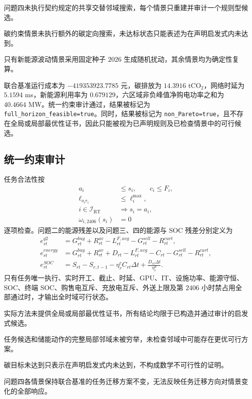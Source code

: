 \documentclass[withoutpreface,bwprint]{cumcmthesis}
\begin{document}
问题四未执行契约规定的共享交替邻域搜索，每个情景只重建并审计一个规则型候选。

碳约束情景未执行额外的碳定向搜索，未达标状态只能表述为在声明启发式内未达到。

只有新能源波动情景采用固定种子 $2026$ 生成随机扰动，其余情景均为确定性复算。

联合基准运行成本为 $-419353923.7785$ 元，碳排放为 $14.3916$ tCO$_2$，网络时延为 $5.1594$ ms，新能源利用率为 $0.679129$，六区域非负峰值净购电功率之和为 $40.4664$ MW。统一约束审计通过，结果被标记为 \texttt{full\_horizon\_feasible=true}。同时，结果被标记为 \texttt{non\_Pareto=true}，且不存在全局或局部最优性证书，因此只能被视为已声明规则及已检查情景中的可行候选。

\subsection{统一约束审计}

任务合法性按
\begin{align}
a_i&\le s_i,\qquad c_i\le F_i,\\
\ell_{o_ir_i}&\le\ell_i^{\max},\\
i\in\mathcal I_{\mathrm{RT}}&\Rightarrow s_i=a_i,\\
\omega_{i,2406}(s_i)&=0
\end{align}
逐项检查。问题二的能源残差以及问题三、四的能源与 SOC 残差分别定义为
\begin{align}
e_{rt}^{q2}
&=G_{rt}^{buy}+R_{rt}^{av}
-L_{rt}^{F,avg}-G_{rt}^{sell}-R_{rt}^{curt},\\
e_{rt}^{energy}
&=G_{rt}^{buy}+R_{rt}^{av}+D_{rt}
-L_{rt}^{F,avg}-C_{rt}-G_{rt}^{sell}-R_{rt}^{curt},\\
e_{rt}^{SOC}
&=S_{rt}-S_{r,t-1}-\eta_r^cC_{rt}\Delta t
+\frac{D_{rt}\Delta t}{\eta_r^d}.
\end{align}
只有任务唯一执行、实时开工、截止、时延、GPU、IT、设施功率、能源守恒、SOC、终端 SOC、购售电互斥、充放电互斥、外送上限及第 $2406$ 小时禁占用全部通过时，才输出全时域可行状态。

实际方法未提供全局或局部最优性证书，所有结论均限于已构造并通过审计的启发式候选。

任务候选和储能动作的完整局部邻域未被穷举，未检查邻域中可能存在更优可行方案。

碳目标未达到只表示在声明启发式内未达到，不构成数学不可行性的证明。

问题四各情景保持联合基准的任务迁移方案不变，无法反映任务迁移方向对情景变化的全部响应。
\end{document}
